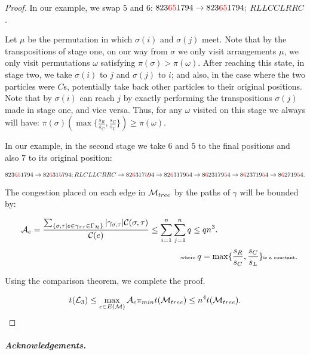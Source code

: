 \documentclass[10 pt]{article}
\newcommand{\Ho}{{\cal H}}
\newcommand{\M}{{\cal M}}
\newcommand{\Lc}{{\cal L}_3}
\begin{document}
\begin{proof}
In our example, we swap $5$ and $6$:  $ 823{\color{red}65}1794\rightarrow 823{\color{red}65}1794;$ $ RLLCCLRRC$.

\medskip

Let $\mu$ be the permutation in which $\sigma(i)$ and $\sigma(j)$ meet. Note that by the transpositions of stage one, on our way from
$\sigma$ we only visit arrangements $\mu$, we only visit permutations $\omega$ satisfying $\pi(\sigma)>\pi(\omega)$.
After reaching this state, in stage two, we take $\sigma(i)$  to  $j$ and $\sigma(j)$ to $i$; and also, in the case where the two particles
were $C$s, potentially take back other particles to their original positions. Note that by  $\sigma(i)$ can reach $j$ by exactly performing the transpositions 
$\sigma(j)$ made in stage one, and vice versa. 
Thus, for any $\omega$  visited on this stage we always will have: $ \pi(\sigma)\left(\max\{\frac{s_R}{s_C},\frac{s_C}{s_L}\}\right)\geq\pi(\omega)$.

\smallskip

In our example, in the second stage we take $6$ and $5$ to the final positions and also $7$ to its original position:


\smallskip

 $823{\color{red}65}1794 \rightarrow 82{\color{red}6}31{\color{red}5}794;  RLCLLCRRC\rightarrow  82{\color{red}6}317{\color{red}5}94\rightarrow  82{\color{red}6}3179{\color{red}5}4\rightarrow 8{\color{red}6}23179{\color{red}5}4 \rightarrow 8{\color{red}6}23719{\color{red}5}4\rightarrow 8{\color{red}6}2719{\color{red}5}4.  $

\medskip

The congestion placed on each edge in $\M_{tree}$ by the paths of $\gamma$ will be bounded by:






$$
 {\cal A}_e= \frac{\sum_{\{\sigma,\tau\vert e \in \gamma_{\sigma\tau}\in \Gamma_{\Ho}\}}
 \vert\gamma_{\sigma,\tau}\vert  {\cal C}(\sigma,\tau)}{{\cal C}(e)}\leq \sum_{i=1}^{n}\sum_{j=1}^nq  \leq q n^3.\hspace{3cm}
 $$
 $$
\hspace{7cm} \text{\tiny ;where } q=\max\{\frac{s_R}{s_C},\frac{s_C}{s_L}\} \text{\tiny is a constant}.
$$






Using the comparison theorem, we complete the proof.

$$
t(\Lc) \leq   \max_{e\in E({\cal M})}{\cal A}_e \pi_{min} t({\cal{M}}_{tree})\leq n^4 t({\cal{M}}_{tree}).
$$
\end{proof}
\subparagraph*{Acknowledgements.}
\end{document}
